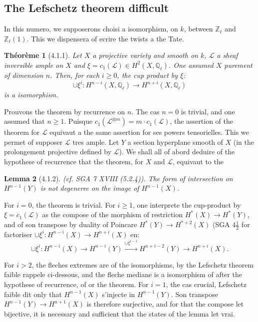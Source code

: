 \documentclass[12pt,a4paper]{article}
\theoremstyle{plain}
\newtheorem{theorem}{Th\'eor\`eme}[section]
\newtheorem{lemma}[theorem]{Lemma}
\theoremstyle{definition}
\theoremstyle{remark}
\newcommand{\QQ}{{\mathbb{Q}}}
\newcommand{\ZZ}{{\mathbb{Z}}}
\begin{document}
\subsection{The Lefschetz theorem difficult}

In this numero, we supposerons choisi a isomorphism, on $k$, between $\ZZ_\ell$ and $\ZZ_\ell(1)$. This we dispensera of ecrire the twists a the Tate.

\begin{theorem}[4.1.1]
Let $X$ a projective variety and smooth on $k$, $\mathscr{L}$ a sheaf inversible ample on $X$ and $\xi = c_1(\mathscr{L}) \in H^2(X, \QQ_\ell)$. One assumed $X$ purement of dimension $n$. Then, for each $i \geq 0$, the cup product by $\xi$:
\[ \cup \xi^i : H^{n-i}(X, \QQ_\ell) \to H^{n+i}(X, \QQ_\ell) \]
is a isomorphism.
\end{theorem}

Prouvons the theorem by recurrence on $n$. The cas $n = 0$ is trivial, and one assumed that $n \geq 1$. Puisque $c_1(\mathscr{L}^{\otimes m}) = m \cdot c_1(\mathscr{L})$, the assertion of the theorem for $\mathscr{L}$ equivaut a the same assertion for ses powers tensorielles. This we permet of supposer $\mathscr{L}$ tres ample. Let $Y$ a section hyperplane smooth of $X$ (in the prolongement projective defined by $\mathscr{L}$). We shall all of abord deduire of the hypothese of recurrence that the theorem, for $X$ and $\mathscr{L}$, equivaut to the

\begin{lemma}[4.1.2]
(cf. SGA 7 XVIII (5.2.4)). The form of intersection on $H^{n-1}(Y)$ is not degeneree on the image of $H^{n-1}(X)$.
\end{lemma}

For $i = 0$, the theorem is trivial. For $i \geq 1$, one interprete the cup-product by $\xi = c_1(\mathscr{L})$ as the compose of the morphism of restriction $H^*(X) \to H^*(Y)$, and of son transpose by duality of Poincare $H^*(Y) \to H^{*+2}(X)$ (SGA 4$\frac{1}{2}$ for factoriser $\cup \xi^i : H^{n-i}(X) \to H^{n+i}(X)$ en:
\[ \cup \xi^i : H^{n-i}(X) \to H^{n-i}(Y) \xrightarrow{\cup \xi^{i-1}} H^{n+i-2}(Y) \to H^{n+i}(X). \]

For $i > 2$, the fleches extremes are of the isomorphisms, by the Lefschetz theorem faible rappele ci-dessous, and the fleche mediane is a isomorphism of after the hypothese of recurrence, of or the theorem. For $i = 1$, the cas crucial, Lefschetz faible dit only that $H^{n-1}(X)$ s'injecte in $H^{n-1}(Y)$. Son transpose $H^{n-1}(Y) \to H^{n+1}(X)$ is therefore surjective, and for that the compose let bijective, it is necessary and sufficient that the states of the lemma let vrai.
\end{document}
